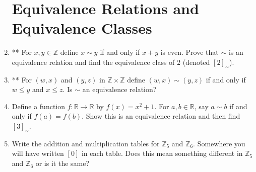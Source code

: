 \documentclass[12pt]{amsart}
\theoremstyle{definition}
\newcommand{\Z}{\mathbb{Z}}
\begin{document}
\begin{enumerate}
\section{Equivalence Relations and Equivalence Classes}

\item ** For $x,y\in \mathbb{Z}$ define $x\sim y$ if and only if $x+y$ is even. Prove that $\sim$ is an equivalence relation and find the equivalence class of $2$ (denoted $[2]_\sim$).\\


\item ** For $(w,x)$ and $(y,z)$ in $\mathbb{Z}\times \mathbb{Z}$ define $(w,x)\sim (y,z)$ if and only if $w\leq y$ and $x\leq z$. Is $\sim$ an equivalence relation?\\

\item Define a function $f:\mathbb{R} \to\mathbb{R}$ by $f(x)=x^2+1$. For $a,b\in \mathbb{R}$, say $a\sim b$ if and only if $f(a) = f(b)$. Show this is an equivalence relation and then find $[3]_{\sim}$.\\

\item Write the addition and multiplication tables for $\Z_5$ and $\Z_6$. Somewhere you will have written $[0]$ in each table. Does this mean something different in $\Z_5$ and $\Z_6$ or is it the same?

%
%
%




\end{enumerate}

  
\end{document}
